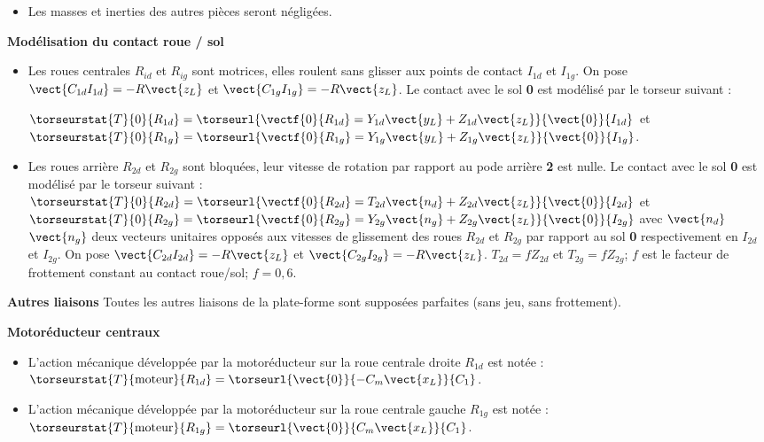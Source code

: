 \begin{itemize}
\item Les masses et inerties des autres pièces seront négligées.
\end{itemize}

\textbf{Modélisation du contact roue / sol}

\begin{itemize}
\item Les roues centrales $R_{id}$ et $R_{ig}$ sont motrices, elles roulent sans glisser aux points de contact $I_{1d}$ et $I_{1g}$. On pose $\vect{C_{1d}I_{1d}}=-R\vect{z_L}$ et $\vect{C_{1g}I_{1g}}=-R\vect{z_L}$. Le contact avec le sol \textbf{0} est modélisé par le torseur suivant :

$\torseurstat{T}{0}{R_{1d}}=\torseurl{\vectf{0}{R_{1d}}=Y_{1d}\vect{y_L}+Z_{1d}\vect{z_L}}{\vect{0}}{I_{1d}}$
et
$\torseurstat{T}{0}{R_{1g}}=\torseurl{\vectf{0}{R_{1g}}=Y_{1g}\vect{y_L}+Z_{1g}\vect{z_L}}{\vect{0}}{I_{1g}}$.

\item Les roues arrière $R_{2d}$ et $R_{2g}$ sont bloquées, leur vitesse de rotation par rapport au pode arrière \textbf{2} est nulle. Le
contact avec le sol \textbf{0} est modélisé par le torseur suivant :
$\torseurstat{T}{0}{R_{2d}}=\torseurl{\vectf{0}{R_{2d}}=T_{2d}\vect{n_d}+Z_{2d}\vect{z_L}}{\vect{0}}{I_{2d}}$
et
$\torseurstat{T}{0}{R_{2g}}=\torseurl{\vectf{0}{R_{2g}}=Y_{2g}\vect{n_g}+Z_{2g}\vect{z_L}}{\vect{0}}{I_{2g}}$
avec $\vect{n_d}$ $\vect{n_g}$ deux vecteurs unitaires opposés aux vitesses de glissement des roues $R_{2d}$ et $R_{2g}$ par rapport au sol \textbf{0}
respectivement en $I_{2d}$ et $I_{2g}$. On pose $\vect{C_{2d}I_{2d}}=-R\vect{z_L}$ et 
$\vect{C_{2g}I_{2g}}=-R\vect{z_L}$. $T_{2d}=fZ_{2d}$ et $T_{2g}=fZ_{2g}$; $f$ est le facteur de frottement constant au contact roue/sol; $f = 0,6$.
\end{itemize}


\textbf{Autres liaisons}
Toutes les autres liaisons de la plate-forme sont supposées parfaites (sans jeu, sans frottement).

\textbf{Motoréducteur centraux}
\begin{itemize}
\item L'action mécanique développée par la motoréducteur sur la roue centrale droite $R_{1d}$ est notée : 
$\torseurstat{T}{\text{moteur}}{R_{1d}} = \torseurl{\vect{0}}{-C_m\vect{x_L}}{C_1}$.
\item L'action mécanique développée par la motoréducteur sur la roue centrale gauche $R_{1g}$ est notée : 
$\torseurstat{T}{\text{moteur}}{R_{1g}} = \torseurl{\vect{0}}{C_m\vect{x_L}}{C_1}$.
\end{itemize}

